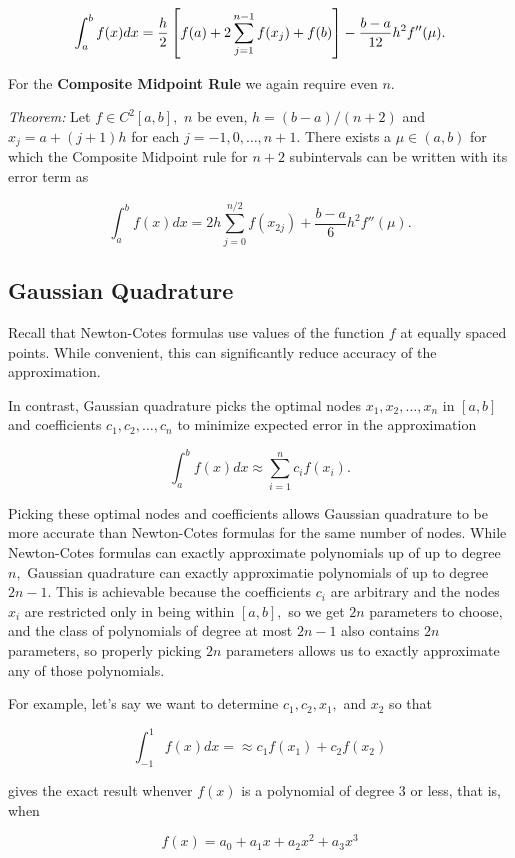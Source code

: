 \documentclass{article}
\begin{document}
\[ \int_a^{b} f(x) dx = \frac{h}{2} \left[f(a) + 2 \sum_{j=1}^{n-1} f(x_j) + f(b)\right] - \frac{b - a}{12} h^2 f''(\mu). \]

For the \textbf{Composite Midpoint Rule} we again require even $n$.

\emph{Theorem:} Let $f \in C^2[a, b],$ $n$ be even, $h = (b - a)/(n + 2)$ and $x_j = a + (j + 1)h$ for each $j = -1, 0, \dots, n+1.$ There exists a $\mu \in (a, b)$ for which the Composite Midpoint rule for $n+2$ subintervals can be written with its error term as

\[ \int_a^{b} f(x) dx = 2h \sum_{j=0}^{n/2} f(x_{2j}) + \frac{b - a}{6}h^2 f''(\mu). \]

\subsection{Gaussian Quadrature}

Recall that Newton-Cotes formulas use values of the function $f$ at equally spaced points. While convenient, this can significantly reduce accuracy of the approximation.

In contrast, Gaussian quadrature picks the optimal nodes $x_1, x_2,\dots,x_n$ in $[a,b]$ and coefficients $c_1, c_2, \dots, c_n$ to minimize expected error in the approximation

\[ \int_a^{b} f(x) dx \approx \sum_{i=1}^{n} c_i f(x_i). \]

Picking these optimal nodes and coefficients allows Gaussian quadrature to be more accurate than Newton-Cotes formulas for the same number of nodes. While Newton-Cotes formulas can exactly approximate polynomials up of up to degree $n,$ Gaussian quadrature can exactly approximatie polynomials of up to degree $2n - 1.$ This is achievable because the coefficients $c_i$ are arbitrary and the nodes $x_i$ are restricted only in being within $[a,b],$ so we get $2n$ parameters to choose, and the class of polynomials of degree at most $2n-1$ also contains $2n$ parameters, so properly picking $2n$ parameters allows us to exactly approximate any of those polynomials.

For example, let's say we want to determine $c_1, c_2, x_1,$ and $x_2$ so that

\[ \int_{-1}^{1} f(x) dx = \approx c_1 f(x_1) + c_2 f(x_2) \]

gives the exact result whenver $f(x)$ is a polynomial of degree 3 or less, that is, when

\[ f(x) = a_0 + a_1x + a_2x^2 + a_3x^3 \]
\end{document}
